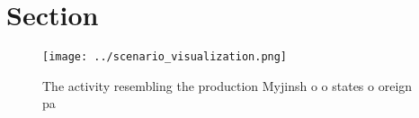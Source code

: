 \documentclass[a4paper]{article}
\begin{document}
\section{Section}

\begin{figure}
\centering
\texttt{[image: ../scenario\_visualization.png]}
\caption{The activity resembling the production Myjinsh o o states o oreign pa
}
\end{figure}
 
\end{document}
